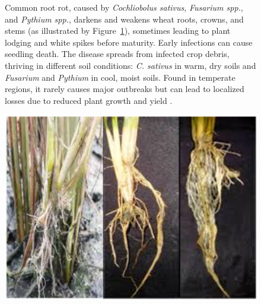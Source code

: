 \begin{figure}[H]
    \centering
    \begin{minipage}{0.65\textwidth}
        \small
        Common root rot, caused by \textit{Cochliobolus sativus}, \textit{Fusarium spp.}, and \textit{Pythium spp.}, darkens and weakens wheat roots, crowns, and stems (as illustrated by Figure~\ref{fig:Figure10}), sometimes leading to plant lodging and white spikes before maturity. Early infections can cause seedling death.
        The disease spreads from infected crop debris, thriving in different soil conditions: \textit{C. sativus} in warm, dry soils and \textit{Fusarium} and \textit{Pythium} in cool, moist soils. Found in temperate regions, it rarely causes major outbreaks but can lead to localized losses due to reduced plant growth and yield \parencite{duveiller2012wheat}.
    \end{minipage}%
    \hfill
    \begin{minipage}{0.3\textwidth}
        \centering
        \includegraphics[width=0.8\linewidth]{chapters/chapter2/images/Figure10.png}
        \label{fig:Figure10}
    \end{minipage}
\end{figure}


